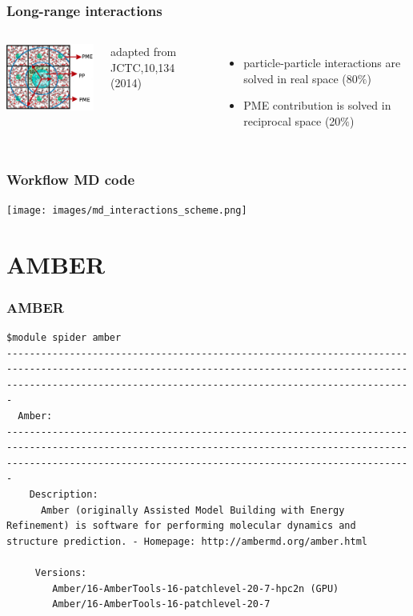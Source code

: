 \begin{frame}
	\frametitle{Long-range interactions}
\begin{columns}
	\column[T]{5cm}
\includegraphics[width=5cm]{images/pppme.png}

{\tiny adapted from JCTC,10,134 (2014)}
	\column[T]{5cm}
	\begin{itemize}
		\item	particle-particle interactions are solved in real space (80$\%$)
		\item	PME contribution is solved in reciprocal space (20$\%$)
	\end{itemize}
\end{columns}
\end{frame}
%
\begin{frame}
	\frametitle{Workflow MD code}
        \begin{center}
\texttt{[image: images/md\_interactions\_scheme.png]}
        \end{center}

\end{frame}
%
\section{AMBER}

\begin{frame}[fragile]
	\frametitle{AMBER}
{\small 
        \begin{verbatim}             
$module spider amber
-------------------------------------------------------------------------------------------------------------------------------------------------------------------------------------------------------------------
  Amber:
-------------------------------------------------------------------------------------------------------------------------------------------------------------------------------------------------------------------
    Description:
      Amber (originally Assisted Model Building with Energy Refinement) is software for performing molecular dynamics and structure prediction. - Homepage: http://ambermd.org/amber.html 

     Versions:
        Amber/16-AmberTools-16-patchlevel-20-7-hpc2n (GPU)
        Amber/16-AmberTools-16-patchlevel-20-7

        \end{verbatim}
}
\end{frame}

